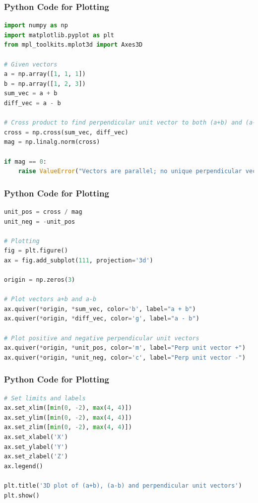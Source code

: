\documentclass{beamer}
\theoremstyle{remark}
\numberwithin{equation}{section}
\begin{document}
\begin{frame}[fragile]
\frametitle{Python Code for Plotting}
\begin{lstlisting}[language=Python]
import numpy as np
import matplotlib.pyplot as plt
from mpl_toolkits.mplot3d import Axes3D

# Given vectors
a = np.array([1, 1, 1])
b = np.array([1, 2, 3])
sum_vec = a + b
diff_vec = a - b

# Cross product to find perpendicular unit vector to both (a+b) and (a-b)
cross = np.cross(sum_vec, diff_vec)
mag = np.linalg.norm(cross)

if mag == 0:
    raise ValueError("Vectors are parallel; no unique perpendicular vector.")

\end{lstlisting}
\end{frame}

\begin{frame}[fragile]
\frametitle{Python Code for Plotting}
\begin{lstlisting}[language=Python]
unit_pos = cross / mag
unit_neg = -unit_pos

# Plotting
fig = plt.figure()
ax = fig.add_subplot(111, projection='3d')

origin = np.zeros(3)

# Plot vectors a+b and a-b
ax.quiver(*origin, *sum_vec, color='b', label="a + b")
ax.quiver(*origin, *diff_vec, color='g', label="a - b")

# Plot positive and negative perpendicular unit vectors
ax.quiver(*origin, *unit_pos, color='m', label="Perp unit vector +")
ax.quiver(*origin, *unit_neg, color='c', label="Perp unit vector -")

\end{lstlisting}
\end{frame}

\begin{frame}[fragile]
\frametitle{Python Code for Plotting}
\begin{lstlisting}[language=Python]
# Set limits and labels
ax.set_xlim([min(0, -2), max(4, 4)])
ax.set_ylim([min(0, -2), max(4, 4)])
ax.set_zlim([min(0, -2), max(4, 4)])
ax.set_xlabel('X')
ax.set_ylabel('Y')
ax.set_zlabel('Z')
ax.legend()

plt.title('3D plot of (a+b), (a-b) and perpendicular unit vectors')
plt.show()
\end{lstlisting}
\end{frame}
\end{document}
